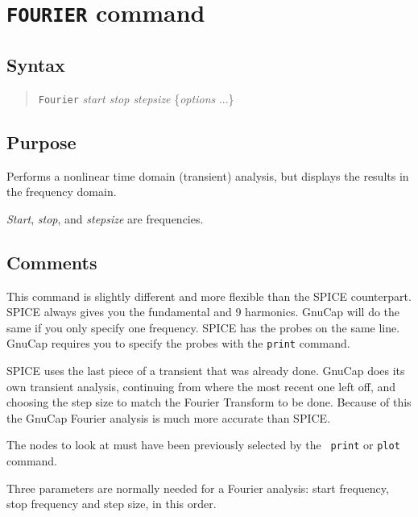 \section{{\tt FOURIER} command}
\subsection{Syntax}
\begin{verse}
{\tt Fourier} {\it start stop stepsize} \{{\it options} ...\}
\end{verse}
\subsection{Purpose}

Performs a nonlinear time domain (transient) analysis, but displays the
results in the frequency domain.

{\it Start}, {\it stop}, and {\it stepsize} are frequencies.
\subsection{Comments}

This command is slightly different and more flexible than the SPICE
counterpart.  SPICE always gives you the fundamental and 9 harmonics.
GnuCap will do the same if you only specify one frequency.  SPICE has
the probes on the same line.  GnuCap requires you to specify the probes
with the {\tt print} command.  

SPICE uses the last piece of a transient that was already done.  GnuCap
does its own transient analysis, continuing from where the most recent
one left off, and choosing the step size to match the Fourier
Transform to be done.  Because of this the GnuCap Fourier analysis is
much more accurate than SPICE.

The nodes to look at must have been previously selected by the {\tt
print} or {\tt plot} command.

Three parameters are normally needed for a Fourier analysis: start
frequency, stop frequency and step size, in this order.


